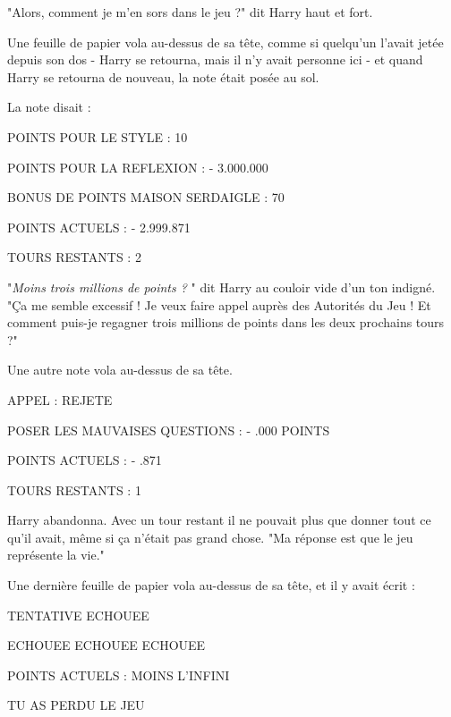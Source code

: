 "Alors, comment je m'en sors dans le jeu ?" dit Harry haut et fort.

Une feuille de papier vola au-dessus de sa tête, comme si quelqu'un l'avait jetée depuis son dos - Harry se retourna, mais il n'y avait personne ici - et quand Harry se retourna de nouveau, la note était posée au sol.

La note disait :

POINTS POUR LE STYLE : 10

POINTS POUR LA REFLEXION : - 3.000.000

BONUS DE POINTS MAISON SERDAIGLE : 70

POINTS ACTUELS : - 2.999.871

TOURS RESTANTS : 2

"\emph{Moins trois millions de points ?} " dit Harry au couloir vide d'un ton indigné. "Ça me semble excessif ! Je veux faire appel auprès des Autorités du Jeu ! Et comment puis-je regagner trois millions de points dans les deux prochains tours ?"

Une autre note vola au-dessus de sa tête.

APPEL : REJETE

POSER LES MAUVAISES QUESTIONS : - .000 POINTS

POINTS ACTUELS : - .871

TOURS RESTANTS : 1

Harry abandonna. Avec un tour restant il ne pouvait plus que donner tout ce qu'il avait, même si ça n'était pas grand chose. "Ma réponse est que le jeu représente la vie."

Une dernière feuille de papier vola au-dessus de sa tête, et il y avait écrit :


\begin{center}TENTATIVE ECHOUEE\end{center}



\begin{center}ECHOUEE ECHOUEE ECHOUEE\end{center}



\begin{center}POINTS ACTUELS : MOINS L'INFINI\end{center}



\begin{center}\MakeUppercase{TU AS PERDU LE JEU}\end{center}



